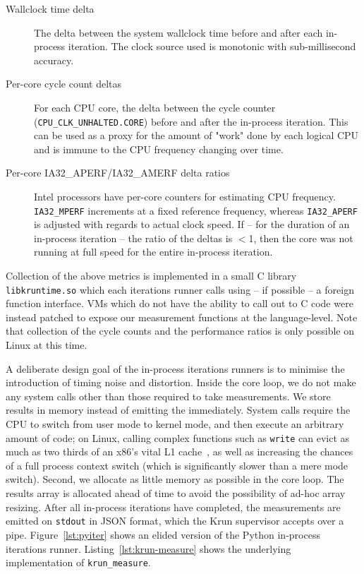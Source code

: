 \documentclass[preprint,numbers,10pt]{sigplanconf}
\newcommand{\krun}{Krun\xspace}
\begin{document}
\begin{description}
\item[Wallclock time delta] The delta between the system wallclock time before
    and after each in-process iteration. The clock source used is monotonic
    with sub-millisecond accuracy.
\item[Per-core cycle count deltas] For each CPU core, the delta between the
    cycle counter (\texttt{CPU\_CLK\_UNHALTED.CORE}) before and after the
    in-process iteration. This can be used as a proxy for the amount of "work"
    done by each logical CPU and is immune to the CPU frequency changing over
    time.
\item[Per-core IA32\_APERF/IA32\_AMERF delta ratios] Intel processors have
    per-core counters for estimating CPU frequency. \texttt{IA32\_MPERF}
    increments at a fixed reference frequency, whereas \texttt{IA32\_APERF} is
    adjusted with regards to actual clock speed. If -- for the duration of an
    in-process iteration -- the ratio of the deltas is $<$1, then the core was
    not running at full speed for the entire in-process iteration.
\end{description}

Collection of the above metrics is implemented in a small C library
\texttt{libkruntime.so} which each iterations runner calls using -- if possible
-- a foreign function interface. VMs which do not have the ability to call out
to C code were instead patched to expose our measurement functions at the
language-level. Note that collection of the cycle counts and the performance
ratios is only possible on Linux at this time.

A deliberate design goal of the in-process iterations runners is to minimise the
introduction of timing noise and distortion. Inside the core loop, we do not
make any system calls other than those required to take measurements. We store
results in memory instead of emitting the immediately. System calls require the
CPU to
switch from user mode to kernel mode, and then execute an arbitrary amount
of code; on Linux, calling complex functions such as \texttt{write} can evict as much
as two thirds of an x86's vital L1 cache~\cite{soares10flexsc}, as well as
increasing the chances of a full process context switch (which is significantly
slower than a mere mode switch). Second, we allocate as little memory as
possible in the core loop. The results array is allocated ahead of time to
avoid the possibility of ad-hoc array resizing. After all in-process iterations
have completed, the measurements are emitted on \texttt{stdout} in JSON format,
which the \krun supervisor accepts over a pipe. Figure~\ref{lst:pyiter} shows
an elided version of the Python in-process iterations runner.
Listing~\ref{lst:krun-measure} shows the underlying implementation of
\texttt{krun\_measure}.
\end{document}
